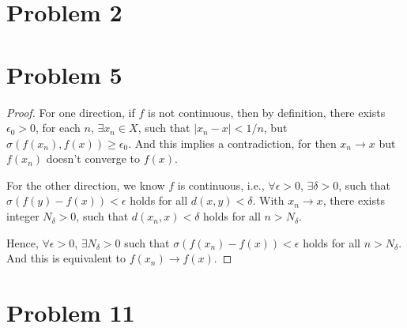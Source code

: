\documentclass[12pt]{article}
\begin{document}
\section*{Problem 2}

\section*{Problem 5}

\begin{proof}

For one direction, if $f$ is not continuous, then by definition, there exists $\epsilon_0 > 0$, for each $n$, $\exists x_n \in X$, such that $|x_n - x| < 1/n$, but $\sigma (f(x_n), f(x)) \geqslant \epsilon_0$. And this implies a contradiction, for then $x_n \rightarrow x$ but $f(x_n)$ doesn't converge to $f(x)$.

For the other direction, we know $f$ is continuous, i.e.,  $\forall \epsilon > 0$, $\exists \delta > 0$, such that $\sigma (f(y) - f(x)) < \epsilon$ holds for all $d(x, y) < \delta$. With $x_n \rightarrow x$, there exists integer $N_\delta > 0$, such that $d(x_n , x) < \delta$ holds for all $n > N_\delta$.

Hence, $\forall \epsilon > 0$, $\exists N_\delta > 0$ such that $\sigma (f(x_n) - f(x)) < \epsilon$ holds for all $n > N_\delta$. And this is equivalent to $f(x_n) \rightarrow f(x)$.

\end{proof}

\section*{Problem 11}
\end{document}
